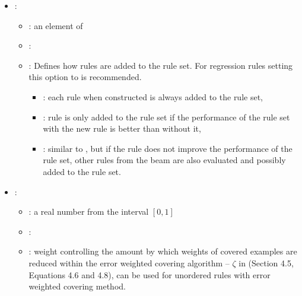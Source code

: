 \begin{itemize}
\begin{itemize}
\begin{itemize}
                \end{itemize}
           \end{itemize}
    \item {}:
           \begin{itemize}
                \item \optionPossibleValues{}: an element of 
                \item \optionDefaultValue{}: 
                \item \optionDescrption{}:  Defines how rules are added to the rule set. For regression rules setting this option to  is recommended.
                \begin{itemize}
                    \item {}: each rule when constructed is always added to the rule set,
                    \item {}: rule is only added to the rule set if the performance of the rule set with the new rule is better than without it,
                    \item {}: similar to , but if the rule does not improve the performance of the rule set, other rules from the beam are also evaluated and possibly added to the rule set.
                \end{itemize}
           \end{itemize}
    \item {}:
           \begin{itemize}
                \item \optionPossibleValues{}: a real number from the interval $[0, 1]$
                \item \optionDefaultValue{}: 
                \item \optionDescrption{}: weight controlling the amount by which weights of covered examples are reduced within the error weighted covering algorithm -- $\zeta$ in \cite{Zenko07} (Section 4.5, Equations 4.6 and 4.8), can be used for unordered rules with error weighted covering method.

\end{itemize}
\end{itemize}
